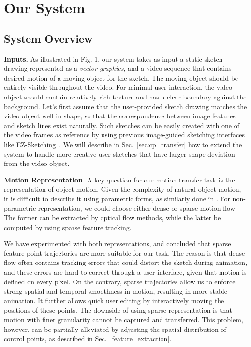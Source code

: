 
\section{Our System}

\subsection{System Overview}\label{sec:overview}

{\bf Inputs.}
As illustrated in Fig. 1, 
our system takes as input a static sketch drawing represented as a {\em vector graphics}, and a video sequence that contains desired motion of a moving object for the sketch. The moving object should be entirely visible throughout the video. For minimal user interaction, the video object should contain relatively rich texture and has a clear boundary against the background. Let's first assume that the user-provided sketch drawing matches the video object well in shape, so that the correspondence between image features and sketch lines exist naturally. Such sketches can be easily created with one of the video frames as reference by using previous image-guided sketching interfaces like EZ-Sketching~\cite{EZSketching:2014}. We will describe in Sec.~\ref{sec:cp_transfer} how to extend the system to handle more creative user sketches that have larger shape deviation from the video object.  

{\bf Motion Representation.}
A key question for our motion transfer task is the representation of object motion. Given the complexity of natural object motion, it is difficult to describe it using parametric forms, as similarly done in \cite{Bregler:2002}. For non-parametric representation, we could choose either dense or sparse motion flow. The former can be extracted by optical flow methods, while the latter be computed by using sparse feature tracking. 

We have experimented with both representations, and concluded that sparse feature point trajectories are more suitable for our task. The reason is that dense flow often contains tracking errors that could distort the sketch during animation, and these errors are hard to correct through a user interface, given that motion is defined on every pixel. 
On the contrary, sparse trajectories allow us to enforce strong spatial and temporal smoothness in motion, resulting in more stable animation. It further allows quick user editing by interactively moving the positions of these points. The downside of using sparse representation is that motion with finer granularity cannot be captured and transferred. This problem, however, can be partially alleviated by adjusting the spatial distribution of control points, as described in Sec.~\ref{feature_extraction}.

